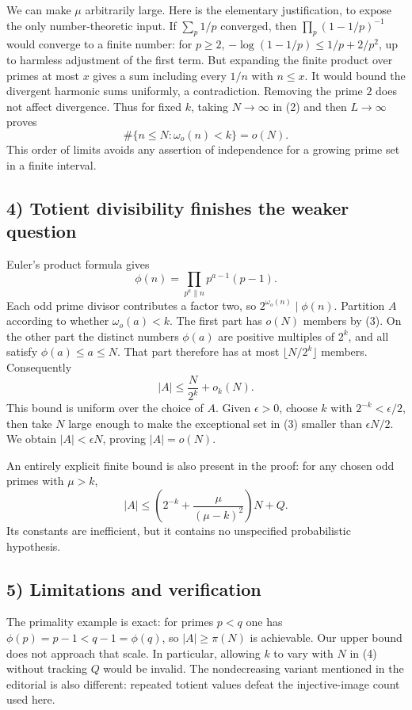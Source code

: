 We can make $\mu$ arbitrarily large. Here is the elementary justification, to expose the only number-theoretic input. If $\sum_p1/p$ converged, then $\prod_p(1-1/p)^{-1}$ would converge to a finite number: for $p\ge2$, $-\log(1-1/p)\le1/p+2/p^2$, up to harmless adjustment of the first term. But expanding the finite product over primes at most $x$ gives a sum including every $1/n$ with $n\le x$. It would bound the divergent harmonic sums uniformly, a contradiction. Removing the prime $2$ does not affect divergence. Thus for fixed $k$, taking $N\to\infty$ in (2) and then $L\to\infty$ proves
\[
 \#\{n\le N:\omega_o(n)<k\}=o(N).\tag{3}
\]
This order of limits avoids any assertion of independence for a growing prime set in a finite interval.

\subsection*{4) Totient divisibility finishes the weaker question}
Euler's product formula gives
\[
 \phi(n)=\prod_{p^a\parallel n}p^{a-1}(p-1).
\]
Each odd prime divisor contributes a factor two, so $2^{\omega_o(n)}\mid\phi(n)$. Partition $A$ according to whether $\omega_o(a)<k$. The first part has $o(N)$ members by (3). On the other part the distinct numbers $\phi(a)$ are positive multiples of $2^k$, and all satisfy $\phi(a)\le a\le N$. That part therefore has at most $\lfloor N/2^k\rfloor$ members. Consequently
\[
 |A|\le\frac{N}{2^k}+o_k(N).\tag{4}
\]
This bound is uniform over the choice of $A$. Given $\epsilon>0$, choose $k$ with $2^{-k}<\epsilon/2$, then take $N$ large enough to make the exceptional set in (3) smaller than $\epsilon N/2$. We obtain $|A|<\epsilon N$, proving $|A|=o(N)$.

An entirely explicit finite bound is also present in the proof: for any chosen odd primes with $\mu>k$,
\[
 |A|\le\left(2^{-k}+\frac{\mu}{(\mu-k)^2}\right)N+Q.
\]
Its constants are inefficient, but it contains no unspecified probabilistic hypothesis.

\subsection*{5) Limitations and verification}
The primality example is exact: for primes $p<q$ one has $\phi(p)=p-1<q-1=\phi(q)$, so $|A|\ge\pi(N)$ is achievable. Our upper bound does not approach that scale. In particular, allowing $k$ to vary with $N$ in (4) without tracking $Q$ would be invalid. The nondecreasing variant mentioned in the editorial is also different: repeated totient values defeat the injective-image count used here.

